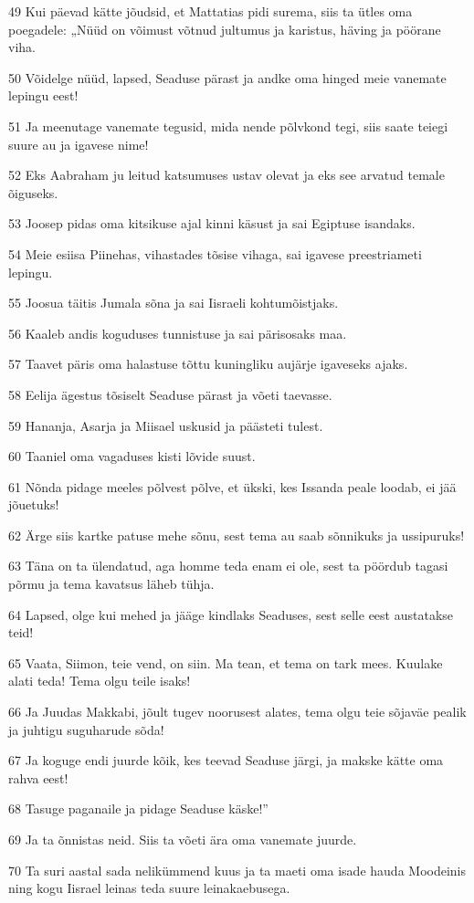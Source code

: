 \par 49 Kui päevad kätte jõudsid, et Mattatias pidi surema, siis ta ütles oma poegadele: „Nüüd on võimust võtnud jultumus ja karistus, häving ja pöörane viha.
\par 50 Võidelge nüüd, lapsed, Seaduse pärast ja andke oma hinged meie vanemate lepingu eest!
\par 51 Ja meenutage vanemate tegusid, mida nende põlvkond tegi, siis saate teiegi suure au ja igavese nime!
\par 52 Eks Aabraham ju leitud katsumuses ustav olevat ja eks see arvatud temale õiguseks.
\par 53 Joosep pidas oma kitsikuse ajal kinni käsust ja sai Egiptuse isandaks.
\par 54 Meie esiisa Piinehas, vihastades tõsise vihaga, sai igavese preestriameti lepingu.
\par 55 Joosua täitis Jumala sõna ja sai Iisraeli kohtumõistjaks.
\par 56 Kaaleb andis koguduses tunnistuse ja sai pärisosaks maa.
\par 57 Taavet päris oma halastuse tõttu kuningliku aujärje igaveseks ajaks.
\par 58 Eelija ägestus tõsiselt Seaduse pärast ja võeti taevasse.
\par 59 Hananja, Asarja ja Miisael uskusid ja päästeti tulest.
\par 60 Taaniel oma vagaduses kisti lõvide suust.
\par 61 Nõnda pidage meeles põlvest põlve, et ükski, kes Issanda peale loodab, ei jää jõuetuks!
\par 62 Ärge siis kartke patuse mehe sõnu, sest tema au saab sõnnikuks ja ussipuruks!
\par 63 Täna on ta ülendatud, aga homme teda enam ei ole, sest ta pöördub tagasi põrmu ja tema kavatsus läheb tühja.
\par 64 Lapsed, olge kui mehed ja jääge kindlaks Seaduses, sest selle eest austatakse teid!
\par 65 Vaata, Siimon, teie vend, on siin. Ma tean, et tema on tark mees. Kuulake alati teda! Tema olgu teile isaks!
\par 66 Ja Juudas Makkabi, jõult tugev noorusest alates, tema olgu teie sõjaväe pealik ja juhtigu suguharude sõda!
\par 67 Ja koguge endi juurde kõik, kes teevad Seaduse järgi, ja makske kätte oma rahva eest!
\par 68 Tasuge paganaile ja pidage Seaduse käske!”
\par 69 Ja ta õnnistas neid. Siis ta võeti ära oma vanemate juurde.
\par 70 Ta suri aastal sada nelikümmend kuus ja ta maeti oma isade hauda Moodeinis ning kogu Iisrael leinas teda suure leinakaebusega.

